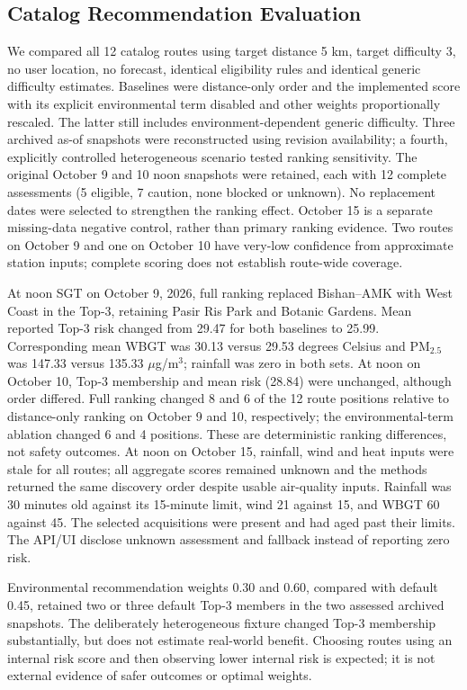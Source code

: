 \subsection{Catalog Recommendation Evaluation}
We compared all 12 catalog routes using target distance 5 km, target difficulty 3,
no user location, no forecast, identical eligibility rules and identical generic
difficulty estimates. Baselines were distance-only order and the implemented score
with its explicit environmental term disabled and other weights proportionally
rescaled. The latter still includes environment-dependent generic difficulty.
Three archived as-of snapshots were reconstructed using revision availability;
a fourth, explicitly controlled heterogeneous scenario tested ranking sensitivity.
The original October 9 and 10 noon snapshots were retained, each with 12 complete
assessments (5 eligible, 7 caution, none blocked or unknown). No replacement dates
were selected to strengthen the ranking effect. October 15 is a separate
missing-data negative control, rather than primary ranking evidence.
Two routes on October 9 and one on October 10 have very-low confidence from
approximate station inputs; complete scoring does not establish route-wide coverage.

At noon SGT on October 9, 2026, full ranking replaced Bishan--AMK with West Coast
in the Top-3, retaining Pasir Ris Park and Botanic Gardens. Mean reported Top-3
risk changed from 29.47 for both baselines to 25.99. Corresponding mean WBGT was
30.13 versus 29.53 degrees Celsius and PM$_{2.5}$ was 147.33 versus
135.33 $\mu$g/m$^3$; rainfall was zero in both sets. At noon on October 10,
Top-3 membership and mean risk (28.84) were unchanged, although order differed.
Full ranking changed 8 and 6 of the 12 route positions relative to distance-only
ranking on October 9 and 10, respectively; the environmental-term ablation changed
6 and 4 positions. These are deterministic ranking differences, not safety outcomes.
At noon on October 15, rainfall, wind and heat inputs were stale for all routes;
all aggregate scores remained unknown and the methods returned the same discovery
order despite usable air-quality inputs. Rainfall was 30 minutes old against its
15-minute limit, wind 21 against 15, and WBGT 60 against 45. The selected acquisitions
were present and had aged past their limits.
The API/UI disclose unknown assessment and fallback instead of reporting zero risk.

Environmental recommendation weights 0.30 and 0.60, compared with default 0.45,
retained two or three default Top-3 members in the two assessed archived snapshots.
The deliberately heterogeneous fixture changed Top-3 membership substantially,
but does not estimate real-world benefit. Choosing routes using an internal risk
score and then observing lower internal risk is expected; it is not external
evidence of safer outcomes or optimal weights.

